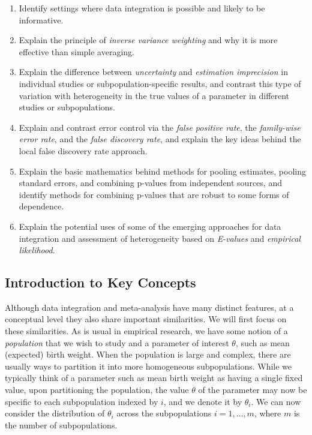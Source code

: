 \begin{enumerate}
    \item Identify settings where data integration is possible and likely to be informative.
    \item Explain the principle of {\em inverse variance weighting} and why it is more effective than simple averaging.
    \item Explain the difference between {\em uncertainty} and {\em estimation imprecision} in individual studies or subpopulation-specific results, and contrast this type of variation with heterogeneity in the true values of a parameter in different studies or subpopulations.
    \item Explain and contrast error control via the {\em false positive rate}, the {\em family-wise error rate}, and the {\em false discovery rate}, and explain the key ideas behind the local false discovery rate approach.
    \item Explain the basic mathematics behind methods for pooling estimates, pooling standard errors, and combining p-values from independent sources, and identify methods for combining p-values that are robust to some forms of dependence.
    \item Explain the potential uses of some of the emerging approaches for data integration and assessment of heterogeneity based on {\em E-values} and {\em empirical likelihood}.
\end{enumerate}

\subsection{Introduction to Key Concepts}

Although data integration and meta-analysis have many distinct features, at a conceptual level they also share important similarities. We will first focus on these similarities. As is usual in empirical research, we have some notion of a {\em population} that we wish to study and a parameter of interest $\theta$, such as mean (expected) birth weight. When the population is large and complex, there are usually ways to partition it into more homogeneous subpopulations. While we typically think of a parameter such as mean birth weight as having a single fixed value, upon partitioning the population, the value $\theta$ of the parameter may now be specific to each subpopulation indexed by $i$, and we denote it by $\theta_i$. We can now consider the distribution of $\theta_i$ across the subpopulations $i=1, \ldots, m$, where $m$ is the number of subpopulations.

